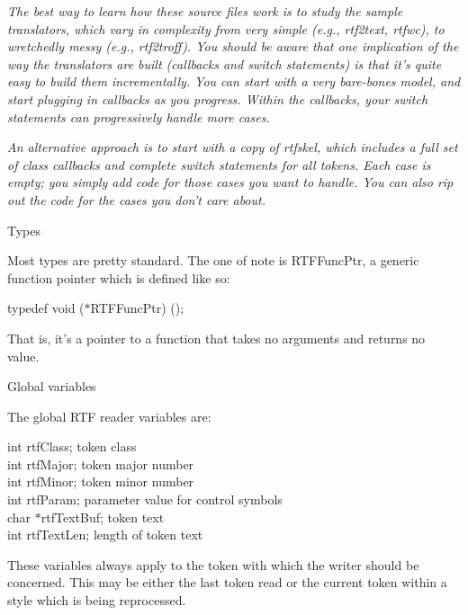 \documentclass{article}
\begin{document}
\noindent
{\em The best way to learn how these source files work is to study the sample 
translators, which vary in complexity from very simple (e.g., rtf2text, rtfwc), 
to wretchedly messy (e.g., rtf2troff). You should be aware that one implication 
of the way the translators are built (callbacks and switch statements) is 
that it's quite easy to build them incrementally. You can start with a very 
bare-bones model, and start plugging in callbacks as you progress. Within 
the callbacks, your switch statements can progressively handle more cases.



\noindent
{\em An alternative approach is to start with a copy of rtfskel, which includes 
a full set of class callbacks and complete switch statements for all tokens. 
Each case is empty; you simply add code for those cases you want to handle. 
You can also rip out the code for the cases you don't care about.



}}
\noindent
Types






\noindent
Most types are pretty standard. The one of note is RTFFuncPtr, a generic 
function pointer which is defined like so:




\noindent
typedef	void ($\ast $RTFFuncPtr) ();




\noindent
That is, it's a pointer to a function that takes no arguments and returns 
no value.




\noindent
Global variables






\noindent
The global RTF reader variables are:






\noindent
int	rtfClass;	token class\\
int	rtfMajor;	token major number\\
int	rtfMinor;	token minor number\\
int	rtfParam;	parameter value for control symbols\\
char	$\ast $rtfTextBuf;	token text\\
int	rtfTextLen;	length of token text






\noindent
These variables always apply to the token with which the writer should be 
concerned. This may be either the last token read or the current token within 
a style which is being reprocessed.
\end{document}
